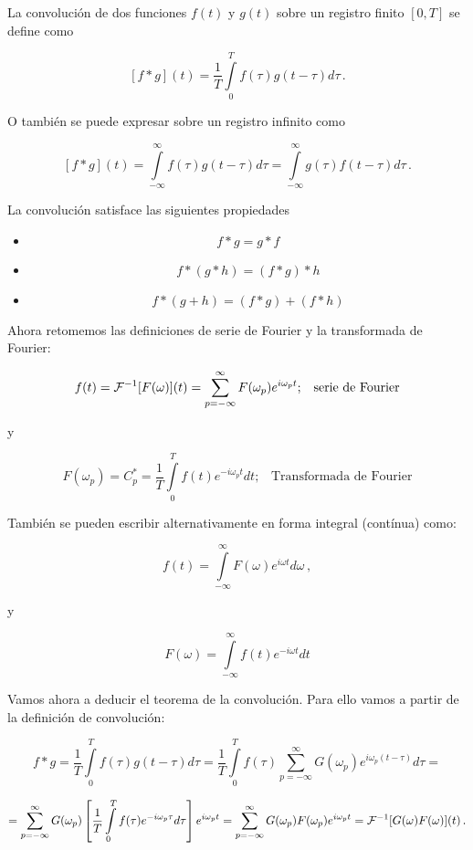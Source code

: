 \documentclass[
]{agujournal2019}
\begin{document}
La convolución de dos funciones \(f(t)\) y \(g(t)\) sobre un registro
finito \([0,T]\) se define como

\[[f*g](t)=\frac{1}{T}\int\limits^{T}_{0}f(\tau)g(t-\tau) d\tau\,.\]

O también se puede expresar sobre un registro infinito como

\[[f*g](t)=\int\limits^{\infty}_{-\infty}f(\tau)g(t-\tau) d\tau = \int\limits^{\infty}_{-\infty}g(\tau)f(t-\tau) d\tau\,.\]

La convolución satisface las siguientes propiedades

\begin{itemize}
\item
  \[f*g=g*f\]
\item
  \[f*(g*h)=(f*g)*h\]
\item
  \[f*(g+h)=(f*g)+(f*h)\]
\end{itemize}

Ahora retomemos las definiciones de serie de Fourier y la transformada
de Fourier:

\begin{framed}
$$f(t)={\cal F}^{-1}[F(\omega)](t)=\sum\limits^{\infty}_{p=-\infty} F(\omega_p) e^{i\omega_p t};\,\,\,\,\,\text{serie de Fourier}$$

y

$$F(\omega_p)=C^*_p=\frac{1}{T}\int\limits^{T}_{0}f(t)e^{-i\omega_p t} dt;\,\,\,\,\,\text{Transformada de Fourier}$$

También se pueden escribir alternativamente en forma integral (contínua) como:

$$f(t)=\int\limits^{\infty}_{-\infty} F(\omega) e^{i\omega t} d\omega\,,$$

y

$$F(\omega)=\int\limits^{\infty}_{-\infty}f(t)e^{-i\omega t} dt$$

\end{framed}

Vamos ahora a deducir el teorema de la convolución. Para ello vamos a
partir de la definición de convolución:

\[f*g=\frac{1}{T}\int\limits^{T}_{0}f(\tau)g(t-\tau) d\tau=
      \frac{1}{T}\int\limits^{T}_{0}f(\tau)\sum\limits^{\infty}_{p=-\infty} G(\omega_p) e^{i\omega_p (t-\tau)} d\tau=\]

\[=\sum\limits^{\infty}_{p=-\infty} G(\omega_p) \left[\frac{1}{T}\int\limits^{T}_{0}f(\tau)e^{-i\omega_p \tau} d\tau \right]
e^{i\omega_p t}=\sum\limits^{\infty}_{p=-\infty} G(\omega_p)F(\omega_p)
e^{i\omega_p t}={\cal F}^{-1}[G(\omega)F(\omega)](t)\,.\]
\end{document}
